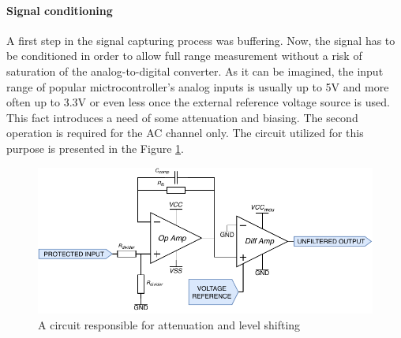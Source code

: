 \documentclass[12pt,a4paper]{article}
\begin{document}
\paragraph{Signal conditioning}
A first step in the signal capturing process was buffering. Now, the signal has to be conditioned in order to allow full range measurement without a risk of saturation of the analog-to-digital converter. As it can be imagined, the input range of popular mictrocontroller's analog inputs is usually up to 5V and more often up to 3.3V or even less once the external reference voltage source is used. This fact introduces a need of some attenuation and biasing. The second operation is required for the AC channel only. The circuit utilized for this purpose is presented in the Figure \ref{fig:input2}.
\par 

\begin{figure}[ht!]
\includegraphics[scale=1.2]{input2.pdf}
\caption{A circuit responsible for attenuation and level shifting}
\label{fig:input2}
\end{figure}
\end{document}
